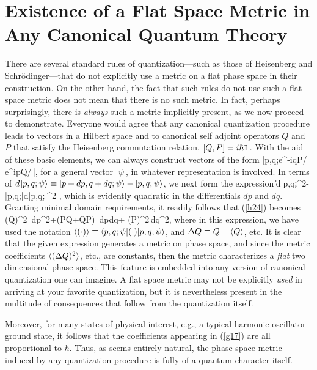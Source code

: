 \section{Existence of a Flat Space Metric in Any Canonical Quantum Theory}
There are several standard rules of quantization---such as those of 
Heisenberg and Schr\"odinger---that do not explicitly use a metric on a 
flat phase space in their construction. On the other hand, the fact that 
such rules do not use such a flat space metric does not mean that there 
is no such metric. In fact, perhaps surprisingly, there is {\it always} 
such a metric implicitly present, as we now proceed to demonstrate. Everyone 
would agree that any canonical quantization procedure leads to vectors in a 
Hilbert space and to canonical self adjoint operators $Q$ and $P$ that 
satisfy the Heisenberg commutation relation, $[Q,P]=i\hbar1\hskip-.37em 1$. With the 
aid of these basic elements, we can always construct vectors of the form
  \bn  |p,q;\psi\>\equiv e^{-iqP/\hbar}\,e^{ipQ/\hbar}\,|\psi\>\;,  \en
for a general vector $|\psi\>$, in whatever representation is involved. In 
terms of $d\hskip.08em|p,q;\psi\rangle\equiv|p+dp,q+dq;\psi\rangle-|p,q;\psi\rangle$, we next form 
the expression
  \bn  \|\s\hbar\s d|p,q;\psi\>\s\|^2-
|\<p,q;\psi|\s\hbar\s d\s |p,q;\psi\>|^2 \;, \label{h24}\en
which is evidently quadratic in the differentials $dp$ and $dq$. 
Granting minimal domain requirements, it readily follows that (\ref{h24}) 
becomes
 \bn  \<(\De Q)^2\>\, dp^2+\<(\De P\De Q+\De Q\De P)\>\, dp\s dq+
\<(\De P)^2\>\,dq^2\;,  \label{g17}\en
where in this expression, we have used the notation 
  $\langle(\cdot)\rangle\equiv\langle p,q;\psi|(\cdot)|p,q;\psi\rangle$, and 
$\Delta Q\equiv Q-\langle Q\rangle$, etc. It is clear that the given expression 
generates a metric on phase space, and since the metric coefficients 
$\langle(\Delta Q)^2\rangle$, etc.,  are constants, then the metric characterizes a 
{\it flat} two dimensional phase space. This feature is embedded into 
any version of canonical quantization one can imagine. A flat space 
metric may not be explicitly {\it used} in arriving at your favorite 
quantization, but it is nevertheless present in the multitude of 
consequences that follow from the quantization itself. 

Moreover, for many states of physical interest, e.g., a typical harmonic 
oscillator ground state, it follows that the coefficients appearing in 
(\ref{g17}) are all proportional to $\hbar$. Thus, as seems entirely 
natural, the phase space metric induced by any quantization procedure is 
fully of a quantum character itself.

